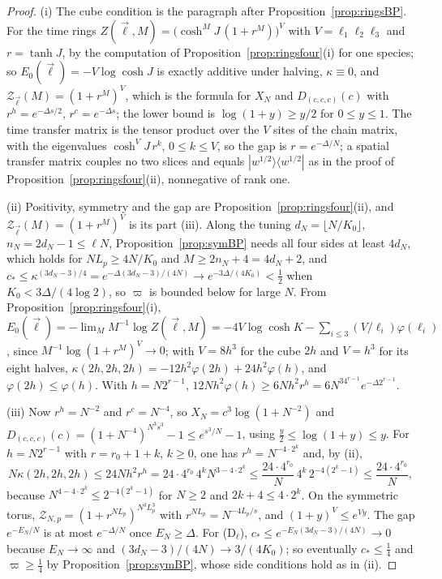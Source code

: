 \begin{proof}
(i) The cube condition is the paragraph after Proposition~\ref{prop:ringsBP}.
For the time rings $Z(\vec\ell,M)=\bigl(\cosh^MJ\,(1+r^M)\bigr)^{V}$ with $V=
\ell_1\ell_2\ell_3$ and $r=\tanh J$, by the computation of
Proposition~\ref{prop:ringsfour}(i) for one species; so $E_0(\vec\ell)=-V\log
\cosh J$ is exactly additive under halving, $\kappa\equiv0$, and
$\mathcal Z_{\vec\ell}(M)=(1+r^M)^V$, which is the formula for $X_N$ and
$D_{(c,c,c)}(c)$ with $r^{h}=e^{-\Delta s/2}$, $r^c=e^{-\Delta s}$; the lower
bound is $\log(1+y)\ge y/2$ for $0\le y\le1$. The time transfer matrix is the
tensor product over the $V$ sites of the chain matrix, with the eigenvalues
$\cosh^VJ\,r^k$, $0\le k\le V$, so the gap is $r=e^{-\Delta/N}$; a spatial
transfer matrix couples no two slices and equals $|w^{1/2}\rangle\langle w^{1/2}|$
as in the proof of Proposition~\ref{prop:ringsfour}(ii), nonnegative of rank
one.

(ii) Positivity, symmetry and the gap are Proposition~\ref{prop:ringsfour}(ii),
and $\mathcal Z_{\vec\ell}(M)=(1+r^M)^V$ is its part (iii). Along the tuning
$d_N=\lfloor N/K_0\rfloor$, $n_N=2d_N-1\le\ell N$, Proposition~\ref{prop:symBP}
needs all four sides at least $4d_N$, which holds for $NL_p\ge4N/K_0$ and $M
\ge2n_N+4=4d_N+2$, and $c_*\le\kappa^{(3d_N-3)/4}=e^{-\Delta(3d_N-3)/(4N)}\to
e^{-3\Delta/(4K_0)}<\frac12$ when $K_0<3\Delta/(4\log2)$, so $\varpi$ is
bounded below for large $N$. From Proposition~\ref{prop:ringsfour}(i),
$E_0(\vec\ell)=-\lim_MM^{-1}\log Z(\vec\ell,M)=-4V\log\cosh K-\sum_{i\le3}(V/
\ell_i)\varphi(\ell_i)$, since $M^{-1}\log(1+r^M)^V\to0$; with $V=8h^3$ for the
cube $2h$ and $V=h^3$ for its eight halves, $\kappa(2h,2h,2h)=-12h^2\varphi(2h)+
24h^2\varphi(h)$, and $\varphi(2h)\le\varphi(h)$. With $h=N2^{r-1}$,
$12Nh^2\varphi(h)\ge6Nh^2r^h=6N^34^{r-1}e^{-\Delta2^{r-1}}$.

(iii) Now $r^h=N^{-2}$ and $r^c=N^{-4}$, so $X_N=c^3\log(1+N^{-2})$ and $D_{(c,
c,c)}(c)=(1+N^{-4})^{N^3s^3}-1\le e^{s^3/N}-1$, using $\frac y2\le\log(1+y)\le
y$. For $h=N2^{r-1}$ with $r=r_0+1+k$, $k\ge0$, one has $r^h=N^{-4\cdot2^k}$
and, by (ii),
\[
N\kappa(2h,2h,2h)\le24Nh^2r^h=24\cdot4^{r_0}\,4^kN^{3-4\cdot2^k}\le\frac{24\cdot
4^{r_0}}N\,4^k\,2^{-4(2^k-1)}\le\frac{24\cdot4^{r_0}}N,
\]
because $N^{4-4\cdot2^k}\le2^{-4(2^k-1)}$ for $N\ge2$ and $2k+4\le4\cdot2^k$.
On the symmetric torus, $\mathcal Z_{N,p}=(1+r^{NL_p})^{N^3L_p^3}$ with
$r^{NL_p}=N^{-4L_p/s}$, and $(1+y)^V\le e^{Vy}$. The gap $e^{-E_N/N}$ is at
most $e^{-\Delta/N}$ once $E_N\ge\Delta$. For (D$_\ell$), $c_*\le e^{-E_N(3d_N
-3)/(4N)}\to0$ because $E_N\to\infty$ and $(3d_N-3)/(4N)\to3/(4K_0)$; so
eventually $c_*\le\frac14$ and $\varpi\ge\frac14$ by Proposition~\ref{prop:symBP},
whose side conditions hold as in (ii).
\end{proof}

